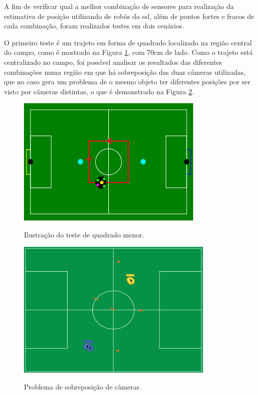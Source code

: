 \documentclass[acronym, symbols, table, deposito]{fei}
\begin{document}
		A fim de verificar qual a melhor combinação de sensores para realização da estimativa de posição utilizando  de robôs da \acrshort{ssl}, além de pontos fortes e fracos de cada combinação, foram realizados testes em dois cenários.
		
		O primeiro teste é um trajeto em forma de quadrado localizado na região central do campo, como é mostrado na Figura \ref{fig:representacao_teste_quadrado_menor}, com 70cm de lado. Como o trajeto está centralizado no campo, foi possível analisar os resultados das diferentes combinações numa região em que há sobreposição das duas câmeras utilizadas, que no caso gera um problema de o mesmo objeto ter diferentes posições por ser visto por câmeras distintas, o que é demonstrado na Figura \ref{fig:problema_overlap}.
		
		\begin{figure}[!htb]
			\centering
			\caption{Ilustração do teste de quadrado menor.}
			\includegraphics[width=0.80\textwidth]{representacao_teste_quadrado_menor.png}
			\label{fig:representacao_teste_quadrado_menor}
		\end{figure}
	
		\begin{figure}[!htb]
			\centering
			\caption{Problema de sobreposição de câmeras.}
			\includegraphics[width=0.85\textwidth]{problema_overlap.png}
			\label{fig:problema_overlap}
		\end{figure}
	
\end{document}
